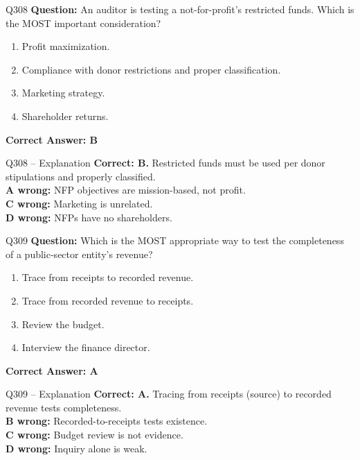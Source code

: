 \documentclass[aspectratio=169,10pt]{beamer}
\begin{document}
	\begin{frame}[t]{Q308}
		\small
		\textbf{Question:} An auditor is testing a not-for-profit's restricted funds. Which is the MOST important consideration?
		\begin{enumerate}[label=\Alph*.,itemsep=1pt,topsep=2pt]
			\item Profit maximization.
			\item Compliance with donor restrictions and proper classification.
			\item Marketing strategy.
			\item Shareholder returns.
		\end{enumerate}
		\vspace{4pt}
		\textbf{Correct Answer: B}
	\end{frame}
	
	\begin{frame}[t]{Q308 -- Explanation}
		\small
		\textbf{Correct: B.} Restricted funds must be used per donor stipulations and properly classified. \\[4pt]
		\textbf{A wrong:} NFP objectives are mission-based, not profit. \\[2pt]
		\textbf{C wrong:} Marketing is unrelated. \\[2pt]
		\textbf{D wrong:} NFPs have no shareholders.
	\end{frame}
	
	\begin{frame}[t]{Q309}
		\small
		\textbf{Question:} Which is the MOST appropriate way to test the completeness of a public-sector entity's revenue?
		\begin{enumerate}[label=\Alph*.,itemsep=1pt,topsep=2pt]
			\item Trace from receipts to recorded revenue.
			\item Trace from recorded revenue to receipts.
			\item Review the budget.
			\item Interview the finance director.
		\end{enumerate}
		\vspace{4pt}
		\textbf{Correct Answer: A}
	\end{frame}
	
	\begin{frame}[t]{Q309 -- Explanation}
		\small
		\textbf{Correct: A.} Tracing from receipts (source) to recorded revenue tests completeness. \\[4pt]
		\textbf{B wrong:} Recorded-to-receipts tests existence. \\[2pt]
		\textbf{C wrong:} Budget review is not evidence. \\[2pt]
		\textbf{D wrong:} Inquiry alone is weak.
	\end{frame}
	
\end{document}
